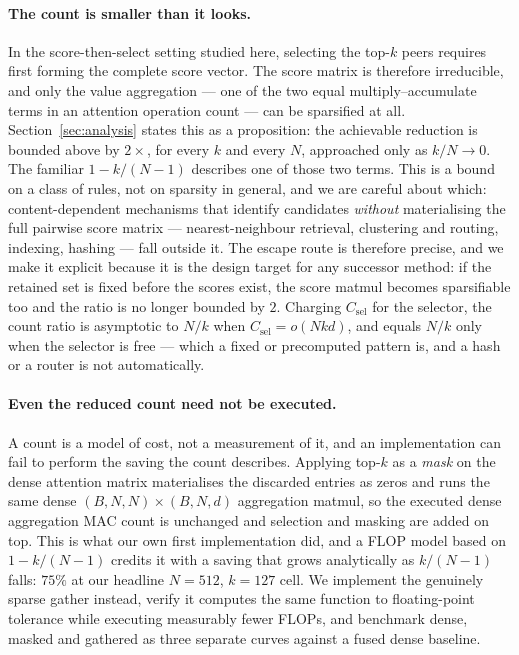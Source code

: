 \paragraph{The count is smaller than it looks.} In the score-then-select
setting studied here, selecting the top-$k$ peers requires first forming the
complete score vector. The score matrix is therefore
irreducible, and only the value aggregation --- one of the two equal
multiply--accumulate terms in an attention operation count --- can be
sparsified at all. Section~\ref{sec:analysis} states this as a proposition: the
achievable reduction is bounded above by $2\times$, for
every $k$ and every $N$, approached only as $k/N \to 0$. The familiar
$1-k/(N-1)$ describes one of those two terms. This is a bound on a class of
rules, not on sparsity in general, and we are careful about which:
content-dependent mechanisms that identify candidates \emph{without}
materialising the full pairwise score matrix --- nearest-neighbour retrieval,
clustering and routing, indexing, hashing --- fall outside it. The escape route
is therefore precise, and we make it explicit because it is the design target
for any successor method: if the retained set is fixed before the scores exist,
the score matmul becomes sparsifiable too and the ratio is no longer bounded by
$2$. Charging $C_{\mathrm{sel}}$ for the selector, the count ratio is
asymptotic to $N/k$ when $C_{\mathrm{sel}} = o(Nkd)$, and equals $N/k$ only
when the selector is free --- which a fixed or precomputed pattern is, and a
hash or a router is not automatically.

\paragraph{Even the reduced count need not be executed.} A count is a model of
cost, not a measurement of it, and an implementation can fail to perform the
saving the count describes. Applying top-$k$ as a \emph{mask} on the dense
attention matrix materialises the discarded entries as zeros and runs the same
dense $(B,N,N)\times(B,N,d)$ aggregation matmul, so the executed dense
aggregation MAC count is unchanged and selection and masking are added on top.
This is what our own first implementation did, and
a FLOP model based on $1-k/(N-1)$ credits it with a saving that grows
analytically as $k/(N-1)$ falls: $75\%$ at our headline $N{=}512$, $k{=}127$
cell. We implement
the genuinely sparse gather instead, verify it computes the same function to
floating-point tolerance while executing measurably fewer FLOPs, and benchmark
dense, masked and gathered as three separate curves against a fused dense
baseline.


